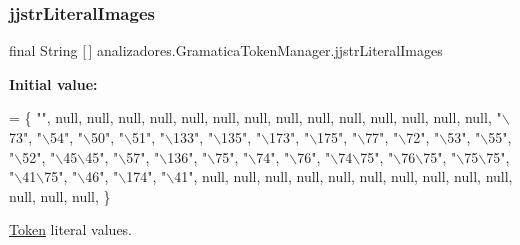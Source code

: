\subsubsection{\texorpdfstring{jjstr\+Literal\+Images}{jjstrLiteralImages}}
{\footnotesize\ttfamily final String \mbox{[}$\,$\mbox{]} analizadores.\+Gramatica\+Token\+Manager.\+jjstr\+Literal\+Images\hspace{0.3cm}{\ttfamily [static]}}

{\bfseries Initial value\+:}
\begin{DoxyCode}
= \{
\textcolor{stringliteral}{""}, null, null, null, null, null, null, null, null, null, null, null, null, 
null, null, \textcolor{stringliteral}{"\(\backslash\)73"}, \textcolor{stringliteral}{"\(\backslash\)54"}, \textcolor{stringliteral}{"\(\backslash\)50"}, \textcolor{stringliteral}{"\(\backslash\)51"}, \textcolor{stringliteral}{"\(\backslash\)133"}, \textcolor{stringliteral}{"\(\backslash\)135"}, \textcolor{stringliteral}{"\(\backslash\)173"}, \textcolor{stringliteral}{"\(\backslash\)175"}, \textcolor{stringliteral}{"\(\backslash\)77"}, 
\textcolor{stringliteral}{"\(\backslash\)72"}, \textcolor{stringliteral}{"\(\backslash\)53"}, \textcolor{stringliteral}{"\(\backslash\)55"}, \textcolor{stringliteral}{"\(\backslash\)52"}, \textcolor{stringliteral}{"\(\backslash\)45\(\backslash\)45"}, \textcolor{stringliteral}{"\(\backslash\)57"}, \textcolor{stringliteral}{"\(\backslash\)136"}, \textcolor{stringliteral}{"\(\backslash\)75"}, \textcolor{stringliteral}{"\(\backslash\)74"}, \textcolor{stringliteral}{"\(\backslash\)76"}, \textcolor{stringliteral}{"\(\backslash\)74\(\backslash\)75"}, 
\textcolor{stringliteral}{"\(\backslash\)76\(\backslash\)75"}, \textcolor{stringliteral}{"\(\backslash\)75\(\backslash\)75"}, \textcolor{stringliteral}{"\(\backslash\)41\(\backslash\)75"}, \textcolor{stringliteral}{"\(\backslash\)46"}, \textcolor{stringliteral}{"\(\backslash\)174"}, \textcolor{stringliteral}{"\(\backslash\)41"}, null, null, null, null, null, null, 
null, null, null, null, null, null, null, \}
\end{DoxyCode}
\mbox{\hyperlink{classanalizadores_1_1_token}{Token}} literal values. \mbox{\label{classanalizadores_1_1_gramatica_token_manager_ab71dac104a1e700d4a241947012f31f4}} 
